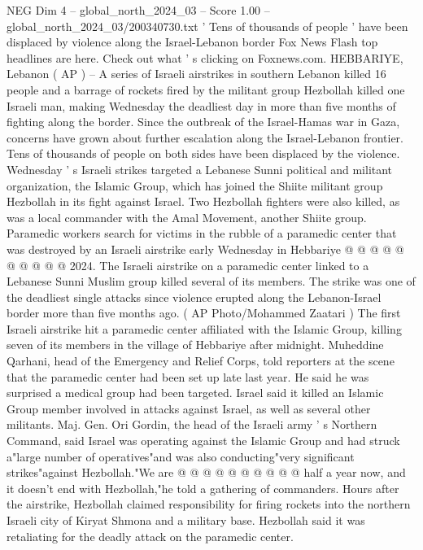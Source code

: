 \begin{textsample}{NEG Dim 4 – global\_north\_2024\_03 – Score 1.00 – global\_north\_2024\_03/200340730.txt}  \label{ex:f4_neg_216}
' Tens of thousands of people ' have been displaced by violence along the Israel-Lebanon border Fox News Flash top headlines are here.
Check out what ' s clicking on Foxnews.com.
HEBBARIYE, Lebanon ( AP ) -- A series of Israeli airstrikes in southern Lebanon killed 16 people and a barrage of rockets fired by the militant group Hezbollah killed one Israeli man, making Wednesday the deadliest day in more than five months of fighting along the border.
Since the outbreak of the Israel-Hamas war in Gaza, concerns have grown about further escalation along the Israel-Lebanon frontier.
Tens of thousands of people on both sides have been displaced by the violence.
Wednesday ' s Israeli strikes targeted a Lebanese Sunni political and militant organization, the Islamic Group, which has joined the Shiite militant group Hezbollah in its fight against Israel.
Two Hezbollah fighters were also killed, as was a local commander with the Amal Movement, another Shiite group.
Paramedic workers search for victims in the rubble of a paramedic center that was destroyed by an Israeli airstrike early Wednesday in Hebbariye @ @ @ @ @ @ @ @ @ @ 2024.
The Israeli airstrike on a paramedic center linked to a Lebanese Sunni Muslim group killed several of its members.
The strike was one of the deadliest single attacks since violence erupted along the Lebanon-Israel border more than five months ago. ( AP Photo/Mohammed Zaatari ) The first Israeli airstrike hit a paramedic center affiliated with the Islamic Group, killing seven of its members in the village of Hebbariye after midnight.
Muheddine Qarhani, head of the Emergency and Relief Corps, told reporters at the scene that the paramedic center had been set up late last year.
He said he was surprised a medical group had been targeted.
Israel said it killed an Islamic Group member involved in attacks against Israel, as well as several other militants.
Maj.
Gen.
Ori Gordin, the head of the Israeli army ' s Northern Command, said Israel was operating against the Islamic Group and had struck a"large number of operatives"and was also conducting"very significant strikes"against Hezbollah."We are @ @ @ @ @ @ @ @ @ @ half a year now, and it doesn't end with Hezbollah,"he told a gathering of commanders.
Hours after the airstrike, Hezbollah claimed responsibility for firing rockets into the northern Israeli city of Kiryat Shmona and a military base.
Hezbollah said it was retaliating for the deadly attack on the paramedic center.

\end{textsample}
